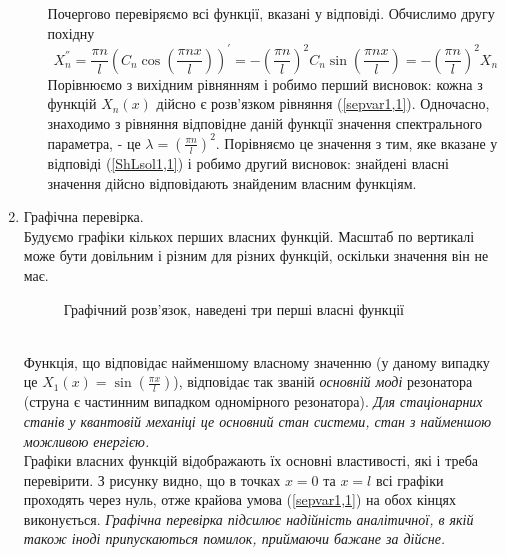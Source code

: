 \begin{enumerate}[wide, labelindent=0pt]
\begin{enumerate}
        Почергово перевіряємо всі функції, вказані у відповіді. Обчислимо другу похідну  
        \begin{equation*}
            X_n^{''} = \frac{\pi n}{l} \left(C_n\cos\left(\frac{\pi n x}{l}\right)\right)^{'} = -\left(\frac{\pi n}{l}\right)^2 C_n\sin\left(\frac{\pi n x}{l}\right) = -\left(\frac{\pi n}{l}\right)^2 X_n
        \end{equation*}
        Порівнюємо з вихідним рівнянням і робимо перший висновок: кожна з функцій $X_n(x)$ дійсно є розв’язком рівняння (\ref{sepvar1,1}). Одночасно, знаходимо з рівняння відповідне даній функції значення спектрального параметра, - це $\lambda = \left(\frac{\pi n}{l}\right)^2$. Порівняємо це значення з тим, яке вказане у відповіді (\ref{ShLsol1,1}) і робимо другий висновок: знайдені власні значення дійсно відповідають знайденим власним функціям.
    \end{enumerate}
    \item Графічна перевірка.\\
    Будуємо графіки кількох перших власних функцій. Масштаб по вертикалі може бути довільним і різним для різних функцій, оскільки значення він не має.
    \begin{figure}[h]
        \centering
    \caption{Графічний розв'язок, наведені три перші власні функції}
    \end{figure}\\
    Функція, що відповідає найменшому власному значенню (у даному випадку це $X_1(x) = \sin\left(\frac{\pi x}{l}\right)$), відповідає так званій \textit{основній моді} резонатора (струна є частинним випадком одномірного резонатора). \textit{Для стаціонарних станів у квантовій механіці це основний стан системи, стан з найменшою можливою енергією.}\\
    Графіки власних функцій відображають їх основні властивості, які і треба перевірити. З рисунку видно, що в точках $x = 0$ та $x = l$ всі графіки проходять через нуль, отже крайова умова (\ref{sepvar1,1}) на обох кінцях виконується. \textit{Графічна перевірка підсилює надійність аналітичної, в якій також іноді припускаються помилок, приймаючи бажане за дійсне.}
\end{enumerate}

